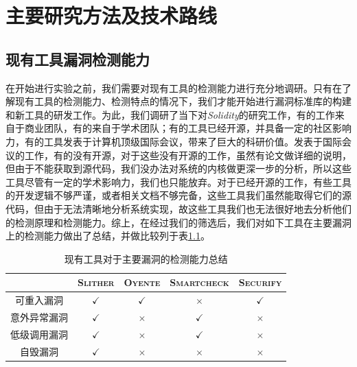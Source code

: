 
\chapter{主要研究方法及技术路线}

\section{现有工具漏洞检测能力}

在开始进行实验之前，我们需要对现有工具的检测能力进行充分地调研。只有在了解现有工具的检测能力、检测特点的情况下，我们才能开始进行漏洞标准库的构建和新工具的研发工作。为此，我们调研了当下对\emph{Solidity}的研究工作，有的工作来自于商业团队，有的来自于学术团队；有的工具已经开源，并具备一定的社区影响力，有的工具发表于计算机顶级国际会议，带来了巨大的科研价值。发表于国际会议的工作，有的没有开源，对于这些没有开源的工作，虽然有论文做详细的说明，但由于不能获取到源代码，我们没办法对系统的内核做更深一步的分析，所以这些工具尽管有一定的学术影响力，我们也只能放弃。对于已经开源的工作，有些工具的开发逻辑不够严谨，或者相关文档不够完备，这些工具我们虽然能取得它们的源代码，但由于无法清晰地分析系统实现，故这些工具我们也无法很好地去分析他们的检测原理和检测能力。综上，在经过我们的筛选后，我们对如下工具在主要漏洞上的检测能力做出了总结，并做比较列于表\ref{tab:detection_capability}。

\begin{table}
  \centering\small
  \caption{现有工具对于主要漏洞的检测能力总结}
  \begin{tabular}{ccccc}
    \toprule
     & \textsc{Slither} & \textsc{Oyente} & \textsc{Smartcheck} & \textsc{Securify} \\
     \midrule
    可重入漏洞 & $\checkmark$ & $\checkmark$ & $\times$ & $\checkmark$  \\
    意外异常漏洞 & $\checkmark$ & $\times$ & $\checkmark$ & $\times$  \\
    低级调用漏洞 & $\checkmark$ & $\times$ & $\checkmark$ & $\times$  \\
    自毁漏洞 & $\checkmark$ & $\times$ & $\times$ & $\times$  \\
    \bottomrule
  \end{tabular}
  \label{tab:detection_capability}
\end{table}

